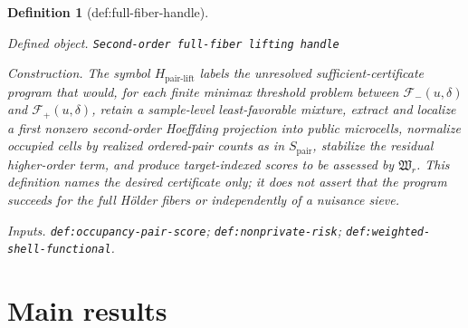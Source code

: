 \documentclass{article}
\newtheorem{definition}{Definition}
\begin{document}
\begin{definition}[def:full-fiber-handle]\label{def:full-fiber-handle}
\par\smallskip\noindent\emph{Defined object.} \texttt{Second-\allowbreak{}order full-\allowbreak{}fiber lifting handle}
\par\smallskip\noindent\emph{Construction.} The symbol \(H_{\mathrm{pair\mbox{-}lift}}\) labels the unresolved sufficient-certificate program that would, for each finite minimax threshold problem between \(\mathcal F_-(u,\delta)\) and \(\mathcal F_+(u,\delta)\), retain a sample-level least-favorable mixture, extract and localize a first nonzero second-order Hoeffding projection into public microcells, normalize occupied cells by realized ordered-pair counts as in \(S_{\mathrm{pair}}\), stabilize the residual higher-order term, and produce target-indexed scores to be assessed by \(\mathfrak W_r\). This definition names the desired certificate only; it does not assert that the program succeeds for the full Hölder fibers or independently of a nuisance sieve.
\par\smallskip\noindent\emph{Inputs.} \texttt{def:\allowbreak{}occupancy-\allowbreak{}pair-\allowbreak{}score}; \texttt{def:\allowbreak{}nonprivate-\allowbreak{}risk}; \texttt{def:\allowbreak{}weighted-\allowbreak{}shell-\allowbreak{}functional}.
\end{definition}

\section{Main results}
\end{document}
